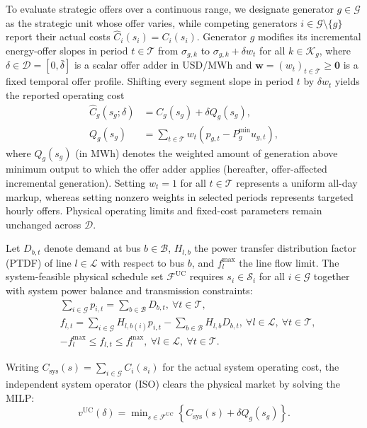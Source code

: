 \documentclass[journal]{IEEEtran}
\newcommand{\Pmin}{P^{\min}}
\newcommand{\UC}{\mathrm{UC}}
\begin{document}
To evaluate strategic offers over a continuous range, we designate generator $g\in\mathcal{G}$ as the strategic unit whose offer varies, while competing generators $i\in\mathcal{G}\setminus\{g\}$ report their actual costs $\widehat{C}_i(s_i)=C_i(s_i)$. Generator $g$ modifies its incremental energy-offer slopes in period $t\in\mathcal{T}$ from $\sigma_{g,k}$ to $\sigma_{g,k}+\delta w_t$ for all $k\in\mathcal{K}_g$, where $\delta\in\mathcal{D}=[0,\bar\delta]$ is a scalar offer adder in USD/MWh and $\bm{w}=(w_t)_{t\in\mathcal{T}}\ge\bm{0}$ is a fixed temporal offer profile. Shifting every segment slope in period $t$ by $\delta w_t$ yields the reported operating cost
\begin{align}
\widehat{C}_g(s_g;\delta) &= C_g(s_g) + \delta Q_g(s_g),\label{eq:reported-cost}\\
Q_g(s_g) &= \sum\nolimits_{t\in\mathcal{T}} w_t\!\left(p_{g,t}-\Pmin_g u_{g,t}\right),\label{eq:exposure}
\end{align}
where $Q_g(s_g)$ (in MWh) denotes the weighted amount of generation above minimum output to which the offer adder applies (hereafter, offer-affected incremental generation). Setting $w_t=1$ for all $t\in\mathcal{T}$ represents a uniform all-day markup, whereas setting nonzero weights in selected periods represents targeted hourly offers. Physical operating limits and fixed-cost parameters remain unchanged across $\mathcal{D}$.

Let $D_{b,t}$ denote demand at bus $b\in\mathcal{B}$, $H_{l,b}$ the power transfer distribution factor (PTDF) of line $l\in\mathcal{L}$ with respect to bus $b$, and $f_l^{\max}$ the line flow limit. The system-feasible physical schedule set $\mathcal{F}^{\UC}$ requires $s_i\in\mathcal{S}_i$ for all $i\in\mathcal{G}$ together with system power balance and transmission constraints:
\begin{align}
&\sum\nolimits_{i\in\mathcal{G}} p_{i,t} = \sum\nolimits_{b\in\mathcal{B}} D_{b,t}, \ \forall t\in\mathcal{T},\label{eq:balance}\\
&f_{l,t} \!\!=\!\! \sum\nolimits_{i\in\mathcal{G}} H_{l,b(i)}p_{i,t} \!\!- \!\!\sum\nolimits_{b\!\in\!\mathcal{B}} H_{l,b}D_{b,t}, \ \forall l\!\!\in\!\!\mathcal{L},\ \forall t\!\!\in\!\!\mathcal{T},\label{eq:network}\\
&-f_l^{\max} \le f_{l,t} \le f_l^{\max}, \ \forall l\in\mathcal{L},\ \forall t\in\mathcal{T}.\label{eq:powerflow}
\end{align}

Writing $C_{\mathrm{sys}}(s)=\sum\nolimits_{i\in\mathcal{G}}C_i(s_i)$ for the actual system operating cost, the independent system operator (ISO) clears the physical market by solving the MILP:
\begin{equation}
v^{\UC}(\delta) = \min\nolimits_{s\in\mathcal{F}^{\UC}}
\left\{ C_{\mathrm{sys}}(s) + \delta Q_g(s_g) \right\}.\label{eq:physical-clearing}
\end{equation}
\end{document}
